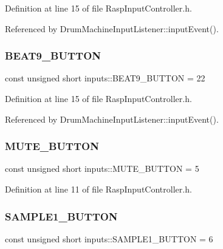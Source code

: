 Definition at line 15 of file Rasp\+Input\+Controller.\+h.



Referenced by Drum\+Machine\+Input\+Listener\+::input\+Event().

\mbox{\label{namespaceinputs_af628ea84bf7114a62249d4bb425ed06a}} 
\subsubsection{\texorpdfstring{B\+E\+A\+T9\+\_\+\+B\+U\+T\+T\+ON}{BEAT9\_BUTTON}}
{\footnotesize\ttfamily const unsigned short inputs\+::\+B\+E\+A\+T9\+\_\+\+B\+U\+T\+T\+ON = 22}



Definition at line 15 of file Rasp\+Input\+Controller.\+h.



Referenced by Drum\+Machine\+Input\+Listener\+::input\+Event().

\mbox{\label{namespaceinputs_af0075a72395787966efcec2403306b43}} 
\subsubsection{\texorpdfstring{M\+U\+T\+E\+\_\+\+B\+U\+T\+T\+ON}{MUTE\_BUTTON}}
{\footnotesize\ttfamily const unsigned short inputs\+::\+M\+U\+T\+E\+\_\+\+B\+U\+T\+T\+ON = 5}



Definition at line 11 of file Rasp\+Input\+Controller.\+h.

\mbox{\label{namespaceinputs_a39dbaf6935309e198c1a0bc6e3468c45}} 
\subsubsection{\texorpdfstring{S\+A\+M\+P\+L\+E1\+\_\+\+B\+U\+T\+T\+ON}{SAMPLE1\_BUTTON}}
{\footnotesize\ttfamily const unsigned short inputs\+::\+S\+A\+M\+P\+L\+E1\+\_\+\+B\+U\+T\+T\+ON = 6}




